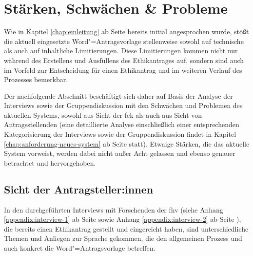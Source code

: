 \documentclass[a4paper,12pt,twoside]{scrreprt}
\begin{document}
\section{Stärken, Schwächen \& Probleme}
\label{sec:stärken-schwächen-probleme}

Wie in Kapitel \ref{chap:einleitung} ab Seite \pageref{chap:einleitung} bereits initial angesprochen wurde, stößt die aktuell eingesetzte Word"=Antragsvorlage stellenweise sowohl auf technische als auch auf inhaltliche Limitierungen. Diese Limitierungen kommen nicht nur während des Erstellens und Ausfüllens des Ethikantrages auf, sondern sind auch im Vorfeld zur Entscheidung für einen Ethikantrag und im weiteren Verlauf des Prozesses bemerkbar.

Der nachfolgende Abschnitt beschäftigt sich daher auf Basis der Analyse der Interviews sowie der Gruppendiskussion mit den Schwächen und Problemen des aktuellen Systems, sowohl aus Sicht der \ac{fek} als auch aus Sicht von Antragsstellenden (eine detaillierte Analyse einschließlich einer entsprechenden Kategorisierung der Interviews sowie der Gruppendiskussion findet in Kapitel \ref{chap:anforderung-neues-system} ab Seite \pageref{chap:anforderung-neues-system} statt). Etwaige Stärken, die das aktuelle System vorweist, werden dabei nicht außer Acht gelassen und ebenso genauer betrachtet und hervorgehoben. 

\subsection{Sicht der Antragsteller:innen}
\label{sub-sec:probleme-sicht-Antragsteller}

In den durchgeführten Interviews mit Forschenden der \ac{fhv} (siehe Anhang \ref{appendix:interview-1} ab Seite \pageref{appendix:interview-1} sowie Anhang \ref{appendix:interview-2} ab Seite \pageref{appendix:interview-2}), die bereits einen Ethikantrag gestellt und eingereicht haben, sind unterschiedliche Themen und Anliegen zur Sprache gekommen, die den allgemeinen Prozess und auch konkret die Word"=Antragsvorlage betreffen.
\end{document}
